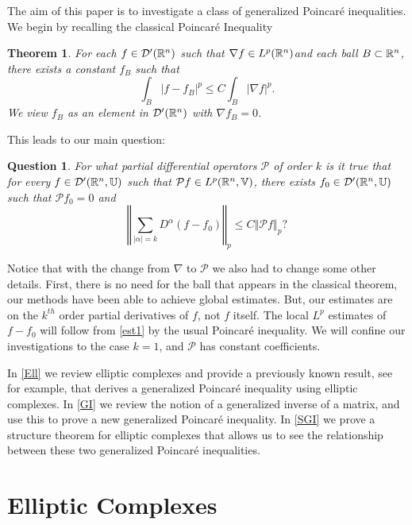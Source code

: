 \documentclass{amsart}
\newtheorem{theorem}{Theorem}[section]
\newtheorem{ques}[ques]{Question}
\theoremstyle{definition}
\numberwithin{equation}{section}
\begin{document}
The aim of this paper is to investigate a class of generalized Poincar\'e inequalities.  We begin by recalling the classical Poincar\'{e} Inequality
\begin{theorem} For each $ f \in {\mathcal{D}}'(\Bbb R^n)$ such that ${\nabla} f \in L^p(\Bbb R^n)$and each ball $B\subset \Bbb R^n$, there exists a constant $f_B$ such that $$\int_B {\left\vert{ f- f_B}\right\vert}^p \leq C \int_B {\left\vert{{\nabla}  f}\right\vert}^p.$$  We view $f_B$ as an element in ${\mathcal{D}}'(\Bbb R^n)$ with ${\nabla}  f_B=0$.
\end{theorem}
This leads to our main question:
\begin{ques}For what partial differential operators ${\mathcal{P}}$ of order $k$ is it true that for every $f \in {\mathcal{D}}'(\Bbb R^n, {\mathbb{U}})$ such that ${\mathcal{P}} f \in L^p(\Bbb R^n, {\mathbb{V}})$, there exists $f_0\in {\mathcal{D}}'(\Bbb R^n, {\mathbb{U}})$ such that ${\mathcal{P}} f_0=0$ and \begin{equation}\label{est1}{\left\Vert{\sum_{{\left\vert{\alpha}\right\vert}=k} D^{\alpha}\left(f- f_0\right)}\right\Vert}_{p} \leq C {\left\Vert{{\mathcal{P}} f}\right\Vert}_p?\end{equation}
\end{ques}
Notice that with the change from ${\nabla}$ to ${\mathcal{P}}$ we also had to change some other details.  First, there is no need for the ball that appears in the classical theorem, our methods have been able to achieve global estimates.  But, our estimates are on the $k^{th}$ order partial derivatives of $f$, not $f$ itself.  The local $L^p$ estimates of $f-f_0$ will follow from \autoref{est1} by the usual Poincar\'{e} inequality.  We will confine our investigations to the case $k=1$, and ${\mathcal{P}}$ has constant coefficients. 

In \autoref{Ell} we review elliptic complexes and provide a previously known result, see \cite{Giannetti_Verde00} for example, that derives a generalized Poincar\'e inequality using elliptic complexes.  In \autoref{GI} we review the notion of a generalized inverse of a matrix, and use this to prove a new generalized Poincar\'e inequality.  In \autoref{SGI} we prove a structure theorem for elliptic complexes that allows us to see the relationship between these two generalized Poincar\'e inequalities.

\section{Elliptic Complexes}\label{Ell}
\end{document}

